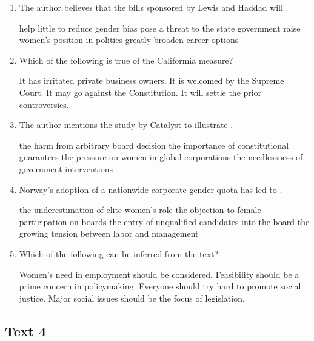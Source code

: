 \begin{enumerate}[resume]
	\item
The author believes that the bills sponsored by Lewis and Haddad will \lineread.


\fourchoices
{help little to reduce gender bias}
{pose a threat to the state government}
{raise women's position in politics}
{greatly broaden career options}


\item
 Which of the following is true of the Califormia measure?


\fourchoices
{It has irritated private business owners.}
{It is welcomed by the Supreme Court.}
{It may go against the Constitution.}
{It will settle the prior controversies.}


\item
 The author mentions the study by Catalyst to illustrate \lineread.


\fourchoices
{the harm from arbitrary board decision}
{the importance of constitutional guarantees}
{the pressure on women in global corporations}
{the needlessness of government interventions}


\item
Norway's adoption of a nationwide corporate gender quota has led to \lineread.


\fourchoices
{the underestimation of elite women's role}
{the objection to female participation on boards}
{the entry of unqualified candidates into the board}
{the growing tension between labor and management}



\item
 Which of the following can be inferred from the text?


\fourchoices
{Women's need in employment should be considered.}
{Feasibility should be a prime concern in policymaking.}
{Everyone should try hard to promote social justice.}
{Major social issues should be the focus of legislation.}

\end{enumerate}



\newpage
\subsection{Text 4}


